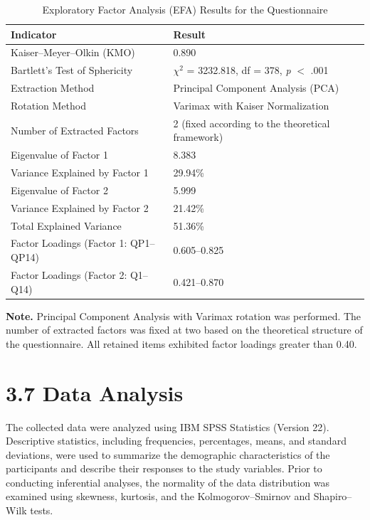 \documentclass[10pt]{NSP1}
\begin{document}
	\setcounter{table}{3}
	\begin{table}[H]
		\centering
		\caption{Exploratory Factor Analysis (EFA) Results for the Questionnaire}
		\small
		\renewcommand{\arraystretch}{1.4}
		\begin{tabular}{|l|l|}
			\hline
			\textbf{Indicator} & \textbf{Result} \\
			\hline
			Kaiser–Meyer–Olkin (KMO) & 0.890 \\
			Bartlett's Test of Sphericity & $\chi^{2}$ = 3232.818, df = 378, \textit{p} $<$ .001 \\
			Extraction Method & Principal Component Analysis (PCA) \\
			Rotation Method & Varimax with Kaiser Normalization \\
			Number of Extracted Factors & 2 (fixed according to the theoretical framework) \\
			Eigenvalue of Factor 1 & 8.383 \\
			Variance Explained by Factor 1 & 29.94\% \\
			Eigenvalue of Factor 2 & 5.999 \\
			Variance Explained by Factor 2 & 21.42\% \\
			Total Explained Variance & 51.36\% \\
			Factor Loadings (Factor 1: QP1–QP14) & 0.605–0.825 \\
			Factor Loadings (Factor 2: Q1–Q14) & 0.421–0.870 \\
			\hline
		\end{tabular}
	\end{table}
	
	\noindent\textbf{Note.} Principal Component Analysis with Varimax rotation was performed. The number of extracted factors was fixed at two based on the theoretical structure of the questionnaire. All retained items exhibited factor loadings greater than 0.40.
	
	\section*{3.7 Data Analysis}
	
	The collected data were analyzed using IBM SPSS Statistics (Version 22). Descriptive statistics, including frequencies, percentages, means, and standard deviations, were used to summarize the demographic characteristics of the participants and describe their responses to the study variables. Prior to conducting inferential analyses, the normality of the data distribution was examined using skewness, kurtosis, and the Kolmogorov–Smirnov and Shapiro–Wilk tests.
	
\end{document}
